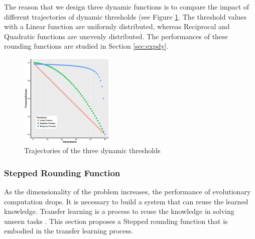 \documentclass[10pt,journal,compsoc]{IEEEtran}
\begin{document}
The reason that we design three dynamic functions is to compare the impact of different trajectories of dynamic thresholds (see Figure \ref{fig:dynamic}. 
The threshold values with a Linear function are uniformly distributed, whereas Reciprocal and Quadratic functions are unevenly distributed. The performances of these rounding functions are studied in Section \ref{sec:expdy}. 





\begin{figure}[H]
\centering
  \includegraphics[width=0.4\textwidth]{pics/roundingFunctions.png}
  \caption{Trajectories of the three dynamic thresholds}
  \label{fig:dynamic}
\end{figure}
%
\vspace{-3 mm}
\subsubsection{Stepped Rounding Function}
\label{sec:transfer}
As the dimensionality of the problem increases, the performance of evolutionary computation drops.
It is necessary to build a system that can reuse the learned knowledge.
Transfer learning is a process to reuse the knowledge in solving unseen tasks \cite{olivas}.
This section proposes a Stepped rounding function that is embodied in the transfer learning process.
\end{document}
